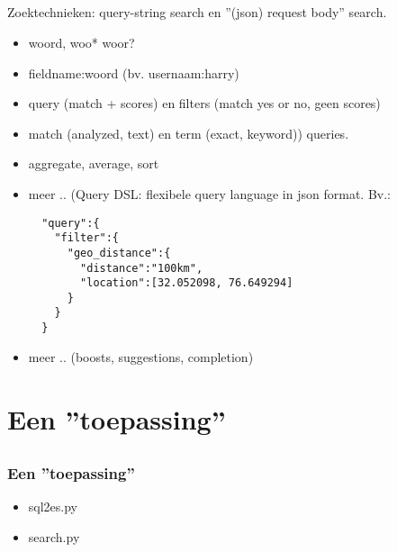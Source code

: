 \subsection{}
\begin{styleframefrag}
	\frametitle{}
Zoektechnieken:
query-string search en ''(json) request body'' search. 
\begin{itemize}[<+>]
	\item woord, woo* woor?  
	\item fieldname:woord (bv. usernaam:harry)
	\item query (match + scores) en filters (match yes or no, geen scores)
	\item match (analyzed, text) en term (exact, keyword)) queries.
	\item aggregate, average, sort
	\item meer .. (Query DSL: flexibele query language in json format. Bv.:
{\scriptsize
\begin{verbatim}
  "query":{
    "filter":{
      "geo_distance":{
        "distance":"100km",
        "location":[32.052098, 76.649294]
      }
    }
  }
\end{verbatim}
}
	\item meer .. (boosts, suggestions, completion)
\end{itemize}
%
\end{styleframefrag}

\section{Een ''toepassing''}
\subsection{}
\begin{styleframe}
    \frametitle{Een ''toepassing''}
\pause
\begin{itemize}[<+>]
	\item sql2es.py
	\item search.py
\end{itemize}
\end{styleframe}

